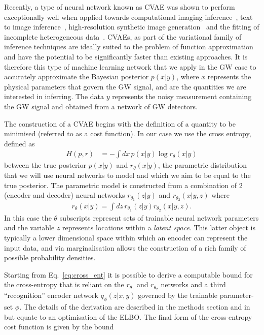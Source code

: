 \documentclass[%
showpacs,
nofootinbib,
 amsmath,amssymb,
 aps,
 twocolumn,
 prl,
 reprint,
floatfix,
]{revtex4-1}
\begin{document}
%
%
Recently, a type of neural network known as \ac{CVAE} was shown to perform
exceptionally well when applied towards computational imaging
inference~\cite{1904.06264,NIPS2015_5775}, text to image
inference~\cite{1512.00570}, high-resolution synthetic image
generation~\cite{1612.00005} and the fitting of incomplete heterogeneous
data~\cite{1807.03653}. \acp{CVAE}, as part of the variational family of
inference techniques are ideally suited to the problem of function
approximation and have the potential to be significantly faster than existing
approaches. It is therefore this type of machine learning network that we
apply in the \ac{GW} case to accurately approximate the Bayesian posterior
$p(x|y)$, where $x$ represents the physical parameters that govern the
\ac{GW} signal, and are the quantities we are interested in inferring. The data
$y$ represents the noisy measurement containing the \ac{GW} signal and obtained
from a network of \ac{GW} detectors. 

%
%
The construction of a \ac{CVAE} begins with the definition of a quantity to be
minimised (referred to as a cost function). In our case we use the cross
entropy, defined as
%
\begin{align}\label{eq:cross_ent} 
H(p,r) &= -\int dx\, p(x|y) \log r_{\theta}(x|y) 
\end{align}
%
between the true posterior $p(x|y)$ and $r_{\theta}(x|y)$, the parametric
distribution that we will use neural networks to model and which we aim
to be equal to the true posterior. The parametric model is
constructed from a combination of 2 (encoder and decoder) neural networks
$r_{\theta_1}(z|y)$ and $r_{\theta_2}(x|y,z)$ where
%
\begin{align}\label{eq:latent_model}
r_{\theta}(x|y) = \int dz\,r_{\theta_1}(z|y)r_{\theta_2}(x|y,z).
\end{align}
%
In this case the $\theta$ subscripts represent sets of trainable neural network
parameters and the variable $z$ represents locations within a \emph{latent
space}. This latter object is typically a lower dimensional space within which
an encoder can represent the input data, and via marginalisation allows the
construction of a rich family of possible probability densities.

Starting from Eq.~\ref{eq:cross_ent} it is possible to derive a
computable bound for the cross-entropy that is reliant on the
$r_{\theta_1}$ and $r_{\theta_2}$ networks and a third ``recognition'' encoder
network $q_{\phi}(z|x,y)$ governed by the trainable parameter-set $\phi$. The
details of the derivation are described in the methods section and
in~\cite{1904.06264} but equate to an optimisation of the \ac{ELBO}. The
final form of the cross-entropy cost function is given by the bound
\end{document}

